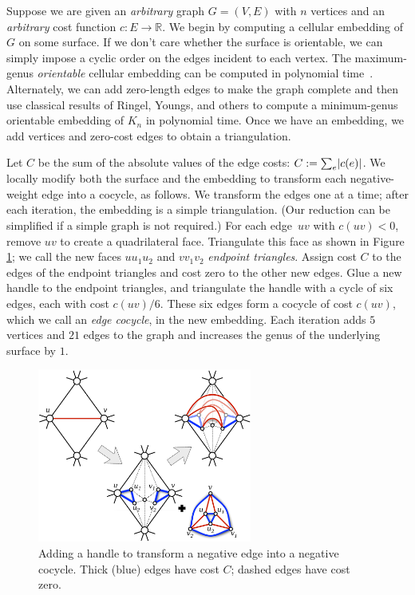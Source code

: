 \documentclass{sig-alternate}
\def\Real{\mathbb{R}}
\begin{document}
Suppose we are given an \emph{arbitrary} graph $G = (V,E)$ with $n$ vertices and an \emph{arbitrary} cost function $c\colon E\to \Real$.  We begin by computing a cellular embedding of $G$ on some surface.  If we don't care whether the surface is orientable, we can simply impose a cyclic order on the edges incident to each vertex.  The maximum-genus \emph{orientable} cellular embedding can be computed in polynomial time~\cite{fgm-fmggi-88}.  Alternately, we can add zero-length edges to make the graph complete and then use classical results of Ringel, Youngs, and others \cite{ry-shmcp-68,r-mct-74} to compute a minimum-genus orientable embedding of $K_n$ in polynomial time.  Once we have an embedding, we add vertices and zero-cost edges to obtain a triangulation.

Let $C$ be the sum of the absolute values of the edge costs: $C:= \sum_e \mathopen| c(e) \mathclose|$.  We locally modify both the surface and the embedding to transform each negative-weight edge into a cocycle, as follows.  We transform the edges one at a time; after each iteration, the embedding is a simple triangulation.  (Our reduction can be simplified if a simple graph is not required.)  For each edge~$uv$ with $c(uv)<0$, remove $uv$ to create a quadrilateral face.  Triangulate this face as shown in Figure \ref{F:addhandle}; we call the new faces $uu_1u_2$ and $vv_1v_2$ \emph{endpoint triangles}.  Assign cost $C$ to the edges of the endpoint triangles and cost zero to the other new edges. Glue a new handle to the endpoint triangles, and triangulate the handle with a cycle of six edges, each with cost $c(uv)/6$.  These six edges form a cocycle of cost $c(uv)$, which we call an \emph{edge cocycle}, in the new embedding.  Each iteration adds $5$ vertices and $21$ edges to the graph and increases the genus of the underlying surface by $1$.

\begin{figure}[hbt]
\centering\includegraphics[height=2.25in]{Fig/addhandle3}
\caption{Adding a handle to transform a negative edge into a negative cocycle.  Thick (blue) edges have cost $C$; dashed edges have cost zero.}
\label{F:addhandle}
\end{figure}
\end{document}

